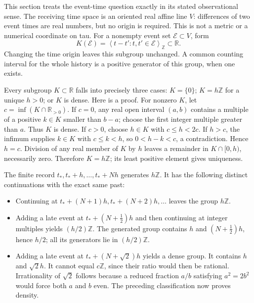 This section treats the event-time question exactly in its stated
observational sense. The receiving time space is an oriented real affine
line \(V\): differences of two event times are real numbers, but no
origin is required. This is not a metric or a numerical coordinate on
tau. For a nonempty event set \(\mathcal E\subset V\), form \[
K(\mathcal E)=\left\langle t-t':t,t'\in\mathcal E\right\rangle_{\mathbb Z}
\subset\mathbb R.
\tag{GW5.1}
\] Changing the time origin leaves this subgroup unchanged. A common
counting interval for the whole history is a positive generator of this
group, when one exists.

Every subgroup \(K\subset\mathbb R\) falls into precisely three cases:
\(K=\{0\}\); \(K=h\mathbb Z\) for a unique \(h>0\); or \(K\) is dense.
Here is a proof. For nonzero \(K\), let \(c=\inf(K\cap\mathbb R_{>0})\).
If \(c=0\), any real open interval \((a,b)\) contains a multiple of a
positive \(k\in K\) smaller than \(b-a\); choose the first integer
multiple greater than \(a\). Thus \(K\) is dense. If \(c>0\), choose
\(h\in K\) with \(c\le h<2c\). If \(h>c\), the infimum supplies
\(k\in K\) with \(c\le k<h\), so \(0<h-k<c\), a contradiction. Hence
\(h=c\). Division of any real member of \(K\) by \(h\) leaves a
remainder in \(K\cap[0,h)\), necessarily zero. Therefore
\(K=h\mathbb Z\); its least positive element gives uniqueness.

The finite record \(t_*,t_*+h,\ldots,t_*+Nh\) generates \(h\mathbb Z\).
It has the following distinct continuations with the exact same past:

\begin{itemize}

\item
  Continuing at \(t_*+(N+1)h,t_*+(N+2)h,\ldots\) leaves the group
  \(h\mathbb Z\).
\item
  Adding a late event at \(t_*+(N+\tfrac12)h\) and then continuing at
  integer multiples yields \((h/2)\mathbb Z\). The generated group
  contains \(h\) and \((N+\tfrac12)h\), hence \(h/2\); all its
  generators lie in \((h/2)\mathbb Z\).
\item
  Adding a late event at \(t_*+(N+\sqrt2)h\) yields a dense group. It
  contains \(h\) and \(\sqrt2h\). It cannot equal \(c\mathbb Z\), since
  their ratio would then be rational. Irrationality of \(\sqrt2\)
  follows because a reduced fraction \(a/b\) satisfying \(a^2=2b^2\)
  would force both \(a\) and \(b\) even. The preceding classification
  now proves density.
\end{itemize}

